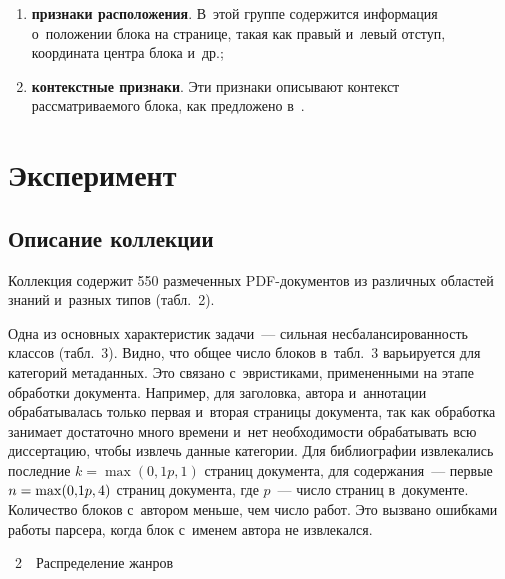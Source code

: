 \begin{multicols}{2}
\begin{enumerate}[(1)]
\item \textbf{признаки расположения}. В~этой группе содержится информация 
о~положении блока на странице, такая как правый и~левый отступ, координата 
цент\-ра блока и~др.;
\item \textbf{контекстные признаки}. Эти признаки описывают контекст 
рас\-смат\-ри\-ва\-емо\-го блока, как пред\-ло\-же\-но в~\cite{Tao}.
\end{enumerate}

\vspace*{-12pt}

\section{Эксперимент}

\subsection{Описание коллекции}

Коллекция содержит 550 размеченных PDF-до\-ку\-мен\-тов из различных областей знаний 
и~разных типов (табл.~2).


  
Одна из основных характеристик задачи~--- сильная несбалансированность классов 
(табл.~3). Видно, что общее чис\-ло блоков в~табл.~3 
варьируется для категорий метаданных. Это связано с~эвристиками, примененными на 
этапе обработки документа. Например, для заголовка, автора и~аннотации 
обрабатывалась только первая и~вторая страницы документа, так как обработка 
занимает достаточно много времени и~нет не\-об\-хо\-ди\-мости обрабатывать всю 
диссертацию, чтобы извлечь данные категории. Для библиографии извлекались 
последние $k = \max(0{,}1p, 1)$ стра\-ниц документа, для содержания~--- первые $n\hm = 
\max(0{,}1p, 4)$ стра\-ниц документа, где $p$~--- чис\-ло стра\-ниц в~документе. 
Количество блоков с~автором меньше, чем чис\-ло работ. Это вызвано ошибками работы 
пар\-се\-ра, когда блок с~именем автора не извлекался.

{\small %
    \begin{center}
    \vspace*{6pt}
    
    \noindent
{{\tablename~2}\ \ \small{Распределение жанров}}

\vspace*{2ex}


\end{center}}
\end{multicols}
